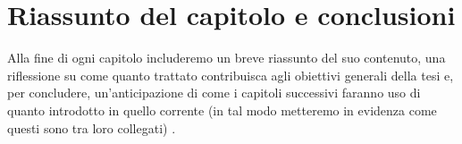 \section{Riassunto del capitolo e conclusioni}

Alla fine di ogni capitolo includeremo un breve riassunto del suo contenuto, una riflessione su come quanto trattato contribuisca agli obiettivi generali della tesi e, per concludere, un'anticipazione di come i capitoli successivi faranno uso di quanto introdotto in quello corrente (in tal modo metteremo in evidenza come questi sono tra loro collegati) \cite{zobel2015writing}.